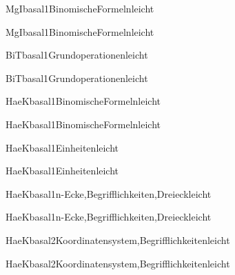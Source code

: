 \documentclass[12pt]{article}
\begin{document}
\pagecolor{green}

\begin{Add}{MgI}{basal1}{BinomischeFormeln}{leicht}
\solution{ }
\end{Add}
\begin{Add}{MgI}{basal1}{BinomischeFormeln}{leicht}
\end{Add}

\begin{Add}{BiT}{basal1}{Grundoperationen}{leicht}
\solution{ }
\end{Add}
\begin{Add}{BiT}{basal1}{Grundoperationen}{leicht}
\end{Add}

\begin{Add}{HaeK}{basal1}{BinomischeFormeln}{leicht}
\solution{ }
\end{Add}
\begin{Add}{HaeK}{basal1}{BinomischeFormeln}{leicht}
\end{Add}

\begin{Add}{HaeK}{basal1}{Einheiten}{leicht}
\solution{ }
\end{Add}
\begin{Add}{HaeK}{basal1}{Einheiten}{leicht}
\end{Add}

\begin{Add}{HaeK}{basal1}{n-Ecke,Begrifflichkeiten,Dreieck}{leicht}
\solution{ }
\end{Add}
\begin{Add}{HaeK}{basal1}{n-Ecke,Begrifflichkeiten,Dreieck}{leicht}
\end{Add}

\begin{Add}{HaeK}{basal2}{Koordinatensystem,Begrifflichkeiten}{leicht}
\solution{ }
\end{Add}
\begin{Add}{HaeK}{basal2}{Koordinatensystem,Begrifflichkeiten}{leicht}
\end{Add}
\end{document}
